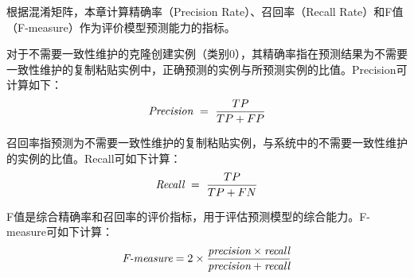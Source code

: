 根据混淆矩阵，本章计算精确率（Precision Rate）、召回率（Recall Rate）和F值（F-measure）作为评价模型预测能力的指标。

对于不需要一致性维护的克隆创建实例（类别$0$），其精确率指在预测结果为不需要一致性维护的复制粘贴实例中，正确预测的实例与所预测实例的比值。Precision可计算如下：
\begin{equation} 
\mbox{\it Precision}~=~{\frac {TP}{TP+FP}}
 \end{equation}
 
召回率指预测为不需要一致性维护的复制粘贴实例，与系统中的不需要一致性维护的实例的比值。Recall可如下计算：
\begin{equation} 
\mbox{\it Recall}~=~{\frac {TP}{TP+FN}}
 \end{equation}

F值是综合精确率和召回率的评价指标，用于评估预测模型的综合能力。F-measure可如下计算：
\begin{equation} 
\mbox{\it F-measure} =2 \times {\frac {\mbox{\it precision} \times \mbox{\it recall} }{ \mbox{\it precision} + \mbox{\it recall} } }
 \end{equation}


